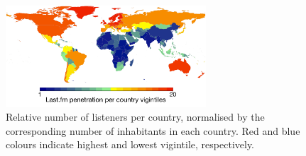 \begin{figure}[!h]
\vspace{1em}
\centering
\includegraphics[width = 0.666\textwidth]{last_fm_penetration.pdf}
\caption[Relative number of listeners per country]{Relative number of listeners per country, normalised by the corresponding number of inhabitants in each country. Red and blue colours indicate highest and lowest vigintile, respectively.}
\label{fig:world_plot_penetration}
\end{figure}



